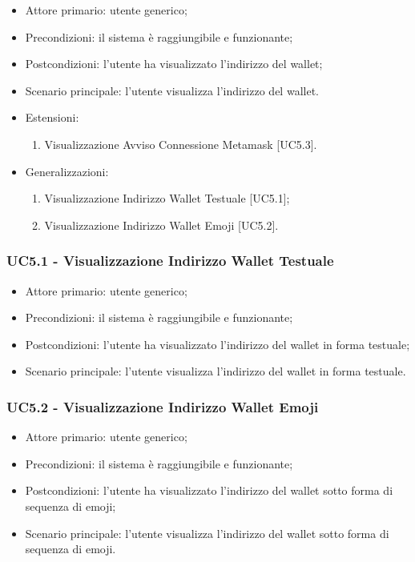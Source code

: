 \begin{itemize}
    \item Attore primario: utente generico;
    \item Precondizioni: il sistema è raggiungibile e funzionante;
    \item Postcondizioni: l'utente ha visualizzato l'indirizzo del wallet;
    \item Scenario principale: l'utente visualizza l'indirizzo del wallet.
    \item Estensioni:
    \begin{enumerate}
        \item Visualizzazione Avviso Connessione Metamask [UC5.3].
    \end{enumerate}
    \item Generalizzazioni:
    \begin{enumerate}
        \item Visualizzazione Indirizzo Wallet Testuale [UC5.1];
        \item Visualizzazione Indirizzo Wallet Emoji [UC5.2].
    \end{enumerate}
\end{itemize}

\subsubsection{UC5.1 - Visualizzazione Indirizzo Wallet Testuale}

\begin{itemize}
    \item Attore primario: utente generico;
    \item Precondizioni: il sistema è raggiungibile e funzionante;
    \item Postcondizioni: l'utente ha visualizzato l'indirizzo del wallet in forma testuale;
    \item Scenario principale: l'utente visualizza l'indirizzo del wallet in forma testuale.
\end{itemize}

\subsubsection{UC5.2 - Visualizzazione Indirizzo Wallet Emoji}

\begin{itemize}
    \item Attore primario: utente generico;
    \item Precondizioni: il sistema è raggiungibile e funzionante;
    \item Postcondizioni: l'utente ha visualizzato l'indirizzo del wallet sotto forma di sequenza di emoji;
    \item Scenario principale: l'utente visualizza l'indirizzo del wallet sotto forma di sequenza di emoji.
\end{itemize}

